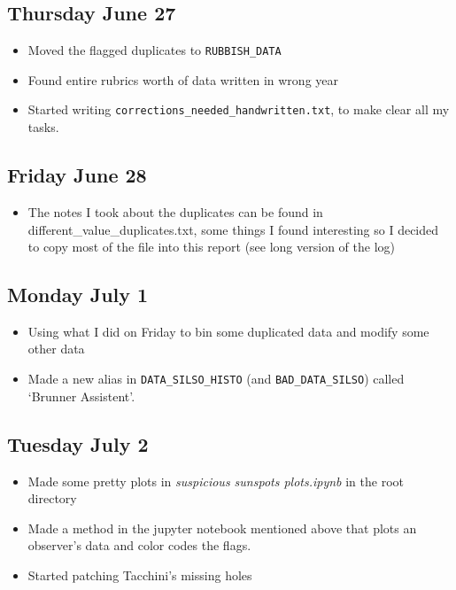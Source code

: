 \documentclass[12pt]{article}
\begin{document}
\subsection{Thursday June 27}
\begin{itemize}
    \item Moved the flagged duplicates to \texttt{RUBBISH\_DATA}
    \item Found entire rubrics worth of data written in wrong year
    \item Started writing \texttt{corrections\_needed\_handwritten.txt}, to make clear all my tasks.
\end{itemize}
    
\subsection{Friday June 28} 
\begin{itemize}
    \item The notes I took about the duplicates can be found in different\_value\_duplicates.txt, some things I found interesting so I decided to copy most of the file into this report (see long version of the log)
\end{itemize}
    
\subsection{Monday July 1}
\begin{itemize}
    \item Using what I did on Friday to bin some duplicated data and modify some other data
    \item Made a new alias in \texttt{DATA\_SILSO\_HISTO} (and \texttt{BAD\_DATA\_SILSO}) called `Brunner Assistent'.
\end{itemize}
    
\subsection{Tuesday July 2}
\begin{itemize}
    \item Made some pretty plots in \textit{suspicious sunspots plots.ipynb} in the root directory
    \item Made a method in the jupyter notebook mentioned above that plots an observer's data and color codes the flags.
    \item Started patching Tacchini's missing holes
\end{itemize}
    
\end{document}
